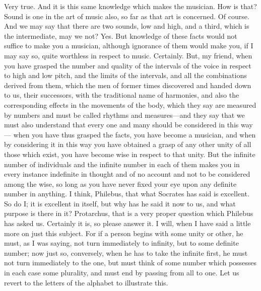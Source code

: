 \documentclass[letterpaper,12pt]{article}
\newcommand{\stephpag}[1]{\marginnote{\small\itshape\fontfamily{ppl}\selectfont #1}}
\begin{document}
\begin{drama}
\protarchusspeaks
Very true.
\socratesspeaks
And it is this same knowledge which makes the musician.
\protarchusspeaks
How is that? \stephpag{c}
\socratesspeaks
Sound is one in the art of music also, so far as that art is concerned.
\protarchusspeaks
Of course.
\socratesspeaks
And we may say that there are two sounds, low and high, and a third, which is the intermediate, may we not?
\protarchusspeaks
Yes.
\socratesspeaks
But knowledge of these facts would not suffice to make you a musician, although ignorance of them would make you, if I may say so, quite worthless in respect to music.
\protarchusspeaks
Certainly.
\socratesspeaks
But, my friend, when you have grasped the number and quality of the intervals of the voice in respect to high and low pitch, and the limits of the intervals, \stephpag{d} and all the combinations derived from them, which the men of former times discovered and handed down to us, their successors, with the traditional name of harmonies, and also the corresponding effects in the movements of the body, which they say are measured by numbers and must be called rhythms and measures---and they say that we must also understand that every one and many should be considered in this way--- \stephpag{e} when you have thus grasped the facts, you have become a musician, and when by considering it in this way you have obtained a grasp of any other unity of all those which exist, you have become wise in respect to that unity. But the infinite number of individuals and the infinite number in each of them makes you in every instance indefinite in thought and of no account and not to be considered among the wise, so long as you have never fixed your eye upon any definite number in anything.
\protarchusspeaks
I think, Philebus, that what Socrates has said is excellent.
\philebusspeaks
So do I; it is excellent in itself, but why has he said it now to us, \stephpag{18 a} and what purpose is there in it?
\socratesspeaks
Protarchus, that is a very proper question which Philebus has asked us.
\protarchusspeaks
Certainly it is, so please answer it.
\socratesspeaks
I will, when I have said a little more on just this subject. For if a person begins with some unity or other, he must, as I was saying, not turn immediately to infinity, but to some definite number; now just so, conversely, when he has to take the infinite first, \stephpag{b} he must not turn immediately to the one, but must think of some number which possesses in each case some plurality, and must end by passing from all to one. Let us revert to the letters of the alphabet to illustrate this.
\protarchusspeaks

\end{drama}
\end{document}
